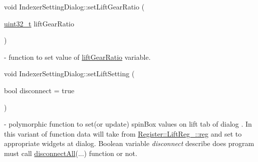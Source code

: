 \mbox{\label{classIndexerSettingDialog_a3b2f9533b1c72aecd3d36bb4d175859f}} 
{\footnotesize\ttfamily void Indexer\+Setting\+Dialog\+::\texorpdfstring{set\+Lift\+Gear\+Ratio}{setLiftGearRatio} (\begin{DoxyParamCaption}\item[{\mbox{\hyperlink{settings_8h_a4196118492a3b1493c81f250e90af775}{uint32\+\_\+t}}}]{lift\+Gear\+Ratio }\end{DoxyParamCaption})} - function to set value of \hyperlink{classIndexerSettingDialog_a9dfafe2970aeba611a1736a3797cc3f3}{lift\+Gear\+Ratio} variable. 

\mbox{\label{classIndexerSettingDialog_ae98cd594c5da327549e306a2ec09718e}} 
{\footnotesize\ttfamily void Indexer\+Setting\+Dialog\+::\texorpdfstring{set\+Lift\+Setting}{setLiftSetting}\hspace{0.1cm}{\footnotesize\ttfamily [1/2]} (\begin{DoxyParamCaption}\item[{bool}]{disconnect = {\ttfamily true} }\end{DoxyParamCaption})} - polymorphic function to set(or update) spin\+Box values on lift tab of dialog . In this variant of function data will take from \hyperlink{structRegister_1_1LiftReg___1_1reg}{Register\+::\+Lift\+Reg\+\_\+\+::reg} and set to appropriate widgets at dialog. Boolean variable \textit{disconnect} describe does program must call \hyperlink{classIndexerSettingDialog_a1a3a501889727528a4f432b233556760}{disconnect\+All}(...) function or not.

